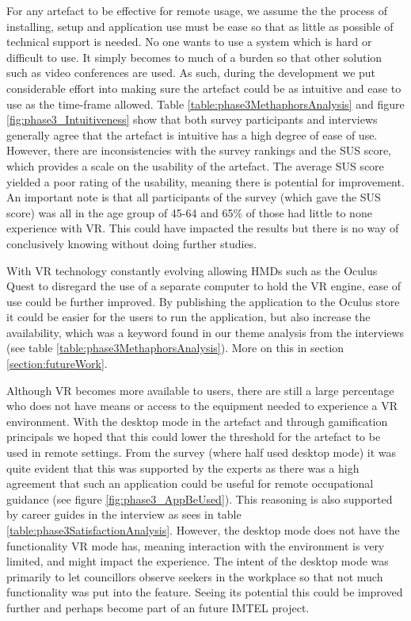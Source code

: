 For any artefact to be effective for remote usage, we assume the the process of installing, setup and application use must be ease so that as little as possible of technical support is needed. No one wants to use a system which is hard or difficult to use. It simply becomes to much of a burden so that other solution such as video conferences are used. As such, during the development we put considerable effort into making sure the artefact could be as intuitive and ease to use as the time-frame allowed. Table \ref{table:phase3MethaphorsAnalysis} and figure \ref{fig:phase3_Intuitiveness} show that both survey participants and interviews generally agree that the artefact is intuitive has a high degree of ease of use. However, there are inconsistencies with the survey rankings and the SUS score, which provides a scale on the usability of the artefact. The average  SUS score yielded a poor rating of the usability, meaning there is potential for improvement. An important note is that all participants of the survey (which gave the SUS score) was all in the age group of 45-64 and 65\% of those had little to none experience with VR. This could have impacted the results but there is no way of conclusively knowing without doing further studies.  

With VR technology constantly evolving allowing HMDs such as the Oculus Quest to disregard the use of a separate computer to hold the VR engine, ease of use could be further improved. By publishing the application to the Oculus store it could be easier for the users to run the application, but also increase the availability, which was a keyword found in our theme analysis from the interviews (see table \ref{table:phase3MethaphorsAnalysis}). More on this in section \ref{section:futureWork}.

Although VR becomes more available to users, there are still a large percentage who does not have means or access to the equipment needed to experience a VR environment. With the desktop mode in the artefact and through gamification principals we hoped that this could lower the threshold for the artefact to be used in remote settings. From the survey (where half used desktop mode) it was quite evident that this was supported by the experts as there was a high agreement that such an application could be useful for remote occupational guidance (see figure \ref{fig:phase3_AppBeUsed}). This reasoning is also supported by career guides in the interview as sees in table \ref{table:phase3SatisfactionAnalysis}. However, the desktop mode does not have the functionality VR mode has, meaning interaction with the environment is very limited, and might impact the experience. The intent of the desktop mode was primarily to let councillors observe seekers in the workplace so that not much functionality was put into the feature. Seeing its potential this could be improved further and perhaps become part of an future IMTEL project. 

